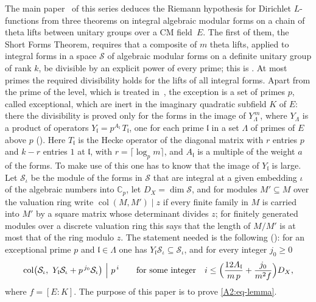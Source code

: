 \documentclass[10pt]{amsart}
\theoremstyle{definition}
\theoremstyle{remark}
\newcommand{\C}{\mathbb C}
\providecommand{\auDX}{D_X}
\providecommand{\auS}{\mathcal S}
\providecommand{\aucol}{\operatorname{col}}
\begin{document}
The main paper~\cite{P46} of this series deduces the Riemann hypothesis for Dirichlet
$L$-functions from three theorems on integral algebraic modular forms on a chain of theta lifts
between unitary groups over a CM field~$E$. The first of them, the Short Forms Theorem, requires
that a composite of $m$ theta lifts, applied to integral forms in a space $\auS$ of algebraic
modular forms on a definite unitary group of rank $k$, be divisible by an explicit power of
every prime; this is {\cite[Theorem~4.21]{P49}}. At most primes the
required divisibility holds for the lifts of all integral forms. Apart from the prime of the
level, which is treated in~\cite{P49}, the exception is a set of primes
$p$, called exceptional, which are inert in the imaginary quadratic subfield $K$ of $E$: there the
divisibility is proved only for the forms in the image of $Y_\Lambda^{\,m}$, where $Y_\Lambda$ is
a product of operators $Y_{\mathfrak l}=p^{A_{\mathfrak l}}\,T_{\mathfrak l}$, one for each prime
$\mathfrak l$ in a set $\Lambda$ of primes of $E$ above $p$ ({\cite[Lemma~4.18]{P49}}). Here
$T_{\mathfrak l}$ is the Hecke operator of the diagonal matrix with $r$ entries $p$ and $k-r$
entries $1$ at $\mathfrak l$, with $r=\lceil\log_pm\rceil$, and $A_{\mathfrak l}$ is a multiple of
the weight $a$ of the forms. To make use of this one has to know that the image of
$Y_{\mathfrak l}$ is large. Let $\auS_\iota$ be the module of the forms in $\auS$ that are
integral at a given embedding $\iota$ of the algebraic numbers into $\C_p$, let $\auDX=\dim\auS$,
and for modules $M'\subseteq M$ over the valuation ring write $\aucol(M,M')\mid z$ if every finite
family in $M$ is carried into $M'$ by a square matrix whose determinant divides $z$; for finitely
generated modules over a discrete valuation ring this says that the length of $M/M'$ is at most
that of the ring modulo $z$. The statement needed is the following ({\cite[Lemma~4.19]{P49}}): for an
exceptional prime $p$ and $\mathfrak l\in\Lambda$ one has $Y_{\mathfrak l}\auS_\iota\subseteq
\auS_\iota$, and for every integer $j_0\ge0$
\begin{equation}\label{A2:eq-lemma}
\aucol\bigl(\auS_\iota,\ Y_{\mathfrak l}\auS_\iota+p^{\,j_0}\auS_\iota\bigr)\ \Big|\ p^{\,i}\qquad
\text{for some integer}\quad i\le\Bigl(\frac{12A_{\mathfrak l}}{m\,p}+\frac{j_0}{m^2f}\Bigr)\auDX ,
\end{equation}
where $f=[E:K]$. The purpose of this paper is to prove \eqref{A2:eq-lemma}.
\end{document}
